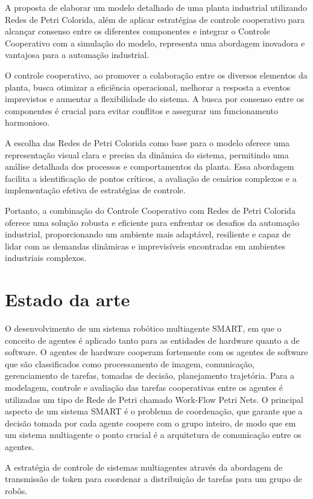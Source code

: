 A proposta de elaborar um modelo detalhado de uma planta industrial utilizando Redes de Petri Colorida, além de aplicar estratégias de controle cooperativo para alcançar consenso entre os diferentes componentes e integrar o Controle Cooperativo com a simulação do modelo, representa uma abordagem inovadora e vantajosa para a automação industrial.

O controle cooperativo, ao promover a colaboração entre os diversos elementos da planta, busca otimizar a eficiência operacional, melhorar a resposta a eventos imprevistos e aumentar a flexibilidade do sistema. A busca por consenso entre os componentes é crucial para evitar conflitos e assegurar um funcionamento harmonioso.

A escolha das Redes de Petri Colorida como base para o modelo oferece uma representação visual clara e precisa da dinâmica do sistema, permitindo uma análise detalhada dos processos e comportamentos da planta. Essa abordagem facilita a identificação de pontos críticos, a avaliação de cenários complexos e a implementação efetiva de estratégias de controle.

Portanto, a combinação do Controle Cooperativo com Redes de Petri Colorida oferece uma solução robusta e eficiente para enfrentar os desafios da automação industrial, proporcionando um ambiente mais adaptável, resiliente e capaz de lidar com as demandas dinâmicas e imprevisíveis encontradas em ambientes industriais complexos.


\section{Estado da arte}
O desenvolvimento de um sistema robótico multiagente SMART, em que o conceito de agentes é aplicado tanto para as entidades de hardware quanto a de software.  O agentes de hardware cooperam fortemente com os agentes de software que são classificados como processamento de imagem, comunicação, gerenciamento de tarefas, tomadas de decisão, planejamento trajetória. Para a modelagem, controle e avaliação das tarefas cooperativas entre os agentes é utilizadas um tipo de Rede de Petri chamado Work-Flow Petri Nets. O principal aspecto de um sistema SMART é o problema de coordenação, que garante que a decisão tomada por cada agente coopere com o grupo inteiro, de modo que em um sistema multiagente o ponto crucial é a arquitetura de comunicação entre os agentes. \cite{smart2013}

A estratégia de controle de sistemas multiagentes através da abordagem de transmissão de token para coordenar a distribuição de tarefas para um grupo de robôs. \cite{token2006} 

